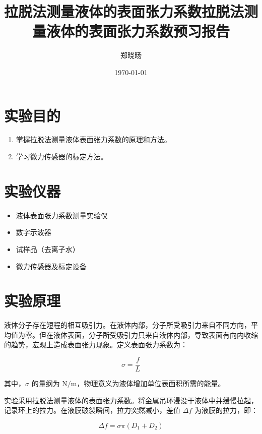 \documentclass[UTF8]{ctexart}
\title{拉脱法测量液体的表面张力系数}
\title{拉脱法测量液体的表面张力系数预习报告}
\author{郑晓旸}
\date{\today}
\begin{document}
\fancyfoot[C]{\thepage}

\maketitle
\tableofcontents
\newpage


\section{实验目的}

\begin{enumerate}
    \item 掌握拉脱法测量液体表面张力系数的原理和方法。
    \item 学习微力传感器的标定方法。
\end{enumerate}

\section{实验仪器}

\begin{itemize}
    \item 液体表面张力系数测量实验仪
    \item 数字示波器
    \item 试样品（去离子水）
    \item 微力传感器及标定设备
\end{itemize}

\section{实验原理}

液体分子存在短程的相互吸引力。在液体内部，分子所受吸引力来自不同方向，平均值为零。但在液体表面，分子所受吸引力只来自液体内部，导致表面有向内收缩的趋势，宏观上造成表面张力现象。定义表面张力系数为：

\begin{equation}
\sigma = \frac{f}{L}
\end{equation}

其中，\(\sigma\) 的量纲为 \(\text{N/m}\)，物理意义为液体增加单位表面积所需的能量。

实验采用拉脱法测量液体的表面张力系数。将金属吊环浸没于液体中并缓慢拉起，记录环上的拉力。在液膜破裂瞬间，拉力突然减小，差值 \(\Delta f\) 为液膜的拉力，即：

\begin{equation}
\Delta f = \sigma \pi (D_1 + D_2)
\end{equation}
\end{document}
